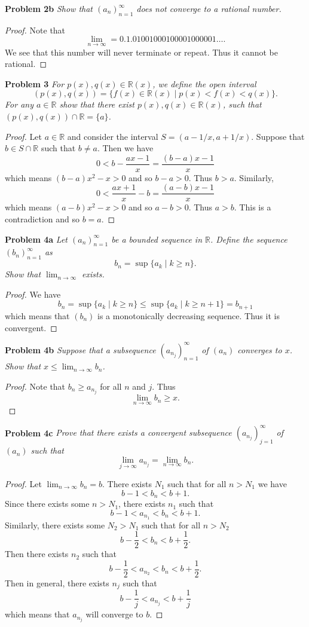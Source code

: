 \documentclass{article}
\begin{document}
\begin{flushleft}
\textbf{Problem 2b}
\textit{Show that $(a_n)_{n=1}^{\infty}$ does not converge to a rational number.}
\begin{proof}
Note that
\[
\lim_{n \rightarrow \infty} = 0.1.01001000100001000001 \dots.
\]
We see that this number will never terminate or repeat. Thus it cannot be rational.
\end{proof}

\textbf{Problem 3}
\textit{For $p(x), q(x) \in \mathbb{R}(x)$, we define the open interval
\[
(p(x), q(x)) = \{f(x) \in \mathbb{R}(x) \mid p(x) < f(x) < q(x)\}.
\]
For any $a \in \mathbb{R}$ show that there exist $p(x), q(x) \in \mathbb{R}(x)$, such that $(p(x), q(x)) \cap \mathbb{R} = \{a\}$.}
\begin{proof}
Let $a \in \mathbb{R}$ and consider the interval $S = (a - 1/x, a + 1/x)$. Suppose that $b \in S \cap \mathbb{R}$ such that $b \neq a$. Then we have
\[
0 < b - \frac{ax - 1}{x} = \frac{(b-a)x - 1}{x}
\]
which means $(b-a)x^2 - x > 0$ and so $b-a > 0$. Thus $b > a$. Similarly,
\[
0 < \frac{ax + 1}{x} - b = \frac{(a-b)x - 1}{x}
\]
which means $(a-b)x^2 - x > 0$ and so $a-b > 0$. Thus $a > b$. This is a contradiction and so $b = a$.
\end{proof}

\textbf{Problem 4a}
\textit{Let $(a_n)_{n=1}^{\infty}$ be a bounded sequence in $\mathbb{R}$. Define the sequence $(b_n)_{n=1}^{\infty}$ as
\[
b_n = \sup \{a_k \mid k \geq n\}.
\]
Show that $\lim_{n \rightarrow \infty}$ exists.}
\begin{proof}
We have
\[
b_n = \sup \{a_k \mid k \geq n\} \leq \sup \{a_k \mid k \geq n + 1\} = b_{n+1}
\]
which means that $(b_n)$ is a monotonically decreasing sequence. Thus it is convergent.
\end{proof}

\textbf{Problem 4b}
\textit{Suppose that a subsequence $(a_{n_j})_{n=1}^{\infty}$ of $(a_n)$ converges to $x$. Show that $x \leq \lim_{n \rightarrow \infty} b_n$.}
\begin{proof}
Note that $b_n \geq a_{n_j}$ for all $n$ and $j$. Thus
\[
\lim_{n \rightarrow \infty} b_n \geq x.
\]
\end{proof}

\textbf{Problem 4c}
\textit{Prove that there exists a convergent subsequence $(a_{n_j})_{j=1}^{\infty}$ of $(a_n)$ such that
\[
\lim_{j \rightarrow \infty} a_{n_j} = \lim_{n \rightarrow \infty} b_n.
\]}
\begin{proof}
Let $\lim_{n \rightarrow \infty} b_n = b$. There exists $N_1$ such that for all $n > N_1$ we have
\[
b-1 < b_n < b+1.
\]
Since there exists some $n > N_1$, there exists $n_1$ such that
\[
b-1 < a_{n_1} < b_n < b + 1.
\]
Similarly, there exists some $N_2 > N_1$ such that for all $n > N_2$
\[
b - \frac{1}{2} < b_n < b + \frac{1}{2}.
\]
Then there exists $n_2$ such that
\[
b - \frac{1}{2} < a_{n_2} < b_n < b + \frac{1}{2}.
\]
Then in general, there exists $n_j$ such that
\[
b - \frac{1}{j} < a_{n_j} < b + \frac{1}{j}
\]
which means that $a_{n_j}$ will converge to $b$.
\end{proof}

\end{flushleft}
\end{document}
